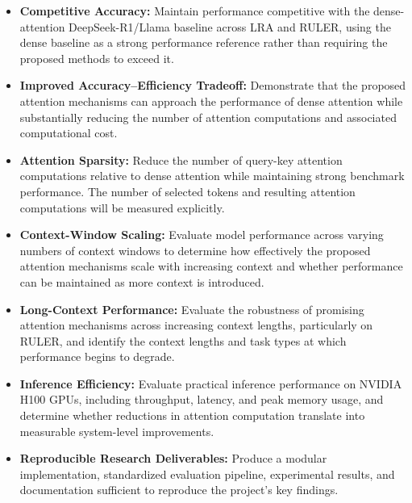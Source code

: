\documentclass{article}
\begin{document}
\begin{itemize}

\item \textbf{Competitive Accuracy:} Maintain performance competitive with the dense-attention DeepSeek-R1/Llama baseline across LRA and RULER, using the dense baseline as a strong performance reference rather than requiring the proposed methods to exceed it.

\item \textbf{Improved Accuracy--Efficiency Tradeoff:} Demonstrate that the proposed attention mechanisms can approach the performance of dense attention while substantially reducing the number of attention computations and associated computational cost.

\item \textbf{Attention Sparsity:} Reduce the number of query-key attention computations relative to dense attention while maintaining strong benchmark performance. The number of selected tokens and resulting attention computations will be measured explicitly.

\item \textbf{Context-Window Scaling:} Evaluate model performance across varying numbers of context windows to determine how effectively the proposed attention mechanisms scale with increasing context and whether performance can be maintained as more context is introduced.

\item \textbf{Long-Context Performance:} Evaluate the robustness of promising attention mechanisms across increasing context lengths, particularly on RULER, and identify the context lengths and task types at which performance begins to degrade.

\item \textbf{Inference Efficiency:} Evaluate practical inference performance on NVIDIA H100 GPUs, including throughput, latency, and peak memory usage, and determine whether reductions in attention computation translate into measurable system-level improvements.

\item \textbf{Reproducible Research Deliverables:} Produce a modular implementation, standardized evaluation pipeline, experimental results, and documentation sufficient to reproduce the project's key findings.


\end{itemize}
\end{document}
